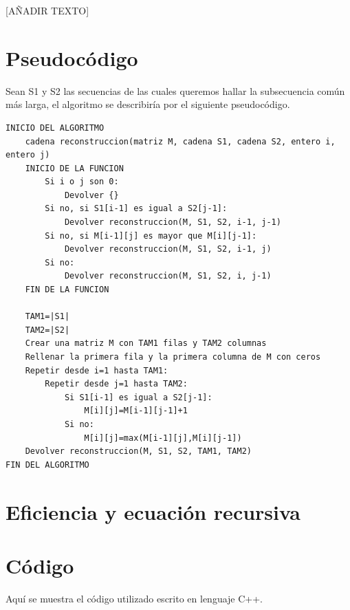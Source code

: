 \documentclass[11pt,a4paper]{article} %
\begin{document}
[AÑADIR TEXTO]\\


\newpage
\section{Pseudocódigo}
Sean S1 y S2 las secuencias de las cuales queremos hallar la subsecuencia común más larga, el algoritmo se describiría por el siguiente pseudocódigo.

\small
{}
\normalsize 	
\begin{lstlisting}
INICIO DEL ALGORITMO
    cadena reconstruccion(matriz M, cadena S1, cadena S2, entero i, entero j)
    INICIO DE LA FUNCION
        Si i o j son 0:
            Devolver {}
        Si no, si S1[i-1] es igual a S2[j-1]:
            Devolver reconstruccion(M, S1, S2, i-1, j-1)
        Si no, si M[i-1][j] es mayor que M[i][j-1]:
            Devolver reconstruccion(M, S1, S2, i-1, j)
        Si no:
            Devolver reconstruccion(M, S1, S2, i, j-1)
    FIN DE LA FUNCION
    
    TAM1=|S1|
    TAM2=|S2|
    Crear una matriz M con TAM1 filas y TAM2 columnas
    Rellenar la primera fila y la primera columna de M con ceros
    Repetir desde i=1 hasta TAM1:
        Repetir desde j=1 hasta TAM2:
            Si S1[i-1] es igual a S2[j-1]:
                M[i][j]=M[i-1][j-1]+1
            Si no:
                M[i][j]=max(M[i-1][j],M[i][j-1])
    Devolver reconstruccion(M, S1, S2, TAM1, TAM2)
FIN DEL ALGORITMO

\end{lstlisting}


\newpage
\section{Eficiencia y ecuación recursiva}



\newpage
\section{Código}
Aquí se muestra el código utilizado escrito en lenguaje C++.
\end{document}
